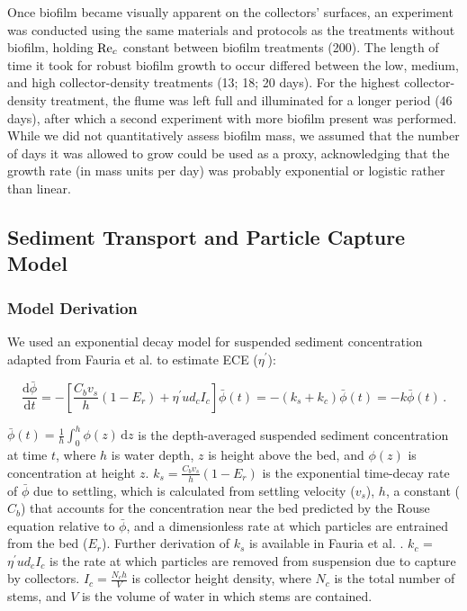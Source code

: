 \documentclass[geosciences,article,submit,moreauthors,pdftex]{Definitions/mdpi}
\begin{document}
Once biofilm became visually apparent on the collectors' surfaces, an experiment was conducted using the same materials and protocols as the treatments without biofilm, holding $\mathrm{Re}_c$ constant between biofilm treatments (200). The length of time it took for robust biofilm growth to occur differed between the low, medium, and high collector-density treatments (13; 18; 20 days). For the highest collector-density treatment, the flume was left full and illuminated for a longer period (46 days), after which a second experiment with more biofilm present was performed. While we did not quantitatively assess biofilm mass, we assumed that the number of days it was allowed to grow could be used as a proxy, acknowledging that the growth rate (in mass units per day) was probably exponential or logistic rather than linear.

\subsection{Sediment Transport and Particle Capture Model}

\subsubsection{Model Derivation}

We used an exponential decay model for suspended sediment concentration adapted from Fauria et al. \cite{Fauria_2015} to estimate ECE ($\eta^\prime$):

\begin{equation}
    \frac{\mathrm{d}\bar{\phi}}{\mathrm{d}t} = -\left[\frac{C_bv_s}{h}(1-E_r) + \eta^{\prime}ud_cI_c\right]\bar{\phi}(t) = -(k_s + k_c)\bar{\phi}(t) = -k\bar{\phi}(t)\,.
    \label{eq:model}    
\end{equation}

\noindent $\bar{\phi}(t) = \frac{1}{h} \int_0^h\phi(z) \,\mathrm{d}z$ is the depth-averaged suspended sediment concentration at time $t$, where $h$ is water depth, $z$ is height above the bed, and $\phi(z)$ is concentration at height $z$. $k_s = \frac{C_bv_s}{h}(1-E_r)$ is the exponential time-decay rate of $\bar{\phi}$ due to settling, which is calculated from settling velocity ($v_s$), $h$, a constant ($C_b$) that accounts for the concentration near the bed predicted by the Rouse equation relative to $\bar{\phi}$, and a dimensionless rate at which particles are entrained from the bed ($E_r$). Further derivation of $k_s$ is available in Fauria et al. \cite{Fauria_2015}. $k_c$ = $\eta^{\prime}ud_cI_c$ is the rate at which particles are removed from suspension due to capture by collectors. $I_c = \frac{N_ch}{V}$ is collector height density, where $N_c$ is the total number of stems, and $V$ is the volume of water in which stems are contained.
\end{document}
